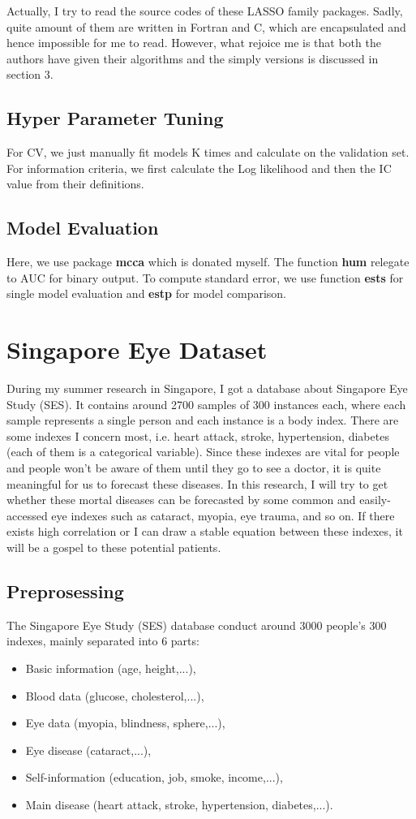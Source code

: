 \documentclass[]{article}
\begin{document}
Actually, I try to read the source codes of these LASSO family packages. Sadly, quite amount of them are written in Fortran and C, which are encapsulated and hence impossible for me to read. However, what rejoice me is that both the authors have given their algorithms and the simply versions is discussed in section 3.
\subsection{Hyper Parameter Tuning}
For CV, we just manually fit models K times and calculate on the validation set. For information criteria, we first calculate the Log likelihood and then the IC value from their definitions.
\subsection{Model Evaluation}
Here, we use package \textbf{mcca} which is donated myself. The function \textbf{hum} relegate to AUC for binary output. To compute standard error, we use function \textbf{ests} for single model evaluation and \textbf{estp} for model comparison.


\section{Singapore Eye Dataset}
During my summer research in Singapore, I got a database about Singapore  Eye Study (SES). It contains around 2700 samples of 300 instances each, where each sample represents a single person and each instance is a body index. There are some indexes I concern most, i.e. heart attack, stroke, hypertension, diabetes (each of them is a categorical variable). Since these indexes are vital for people and people won’t be aware of them until they go to see a doctor, it is quite meaningful for us to forecast these diseases. In this research, I will try to get whether these mortal diseases can be forecasted by some common and easily-accessed eye indexes such as cataract, myopia, eye trauma, and so on. If there exists high correlation or I can draw a stable equation between these indexes, it will be a gospel to these potential patients.
\subsection{Preprosessing}
The Singapore  Eye Study (SES) database conduct around 3000 people’s 300 indexes, mainly separated into 6 parts: 
\begin{itemize}
	\item Basic information (age, height,...),
	\item Blood data (glucose, cholesterol,...),
	\item Eye data (myopia, blindness, sphere,...),
	\item Eye disease (cataract,...),
	\item Self-information (education, job, smoke, income,...),
	\item Main disease (heart attack, stroke, hypertension, diabetes,...).
\end{itemize}
      
\end{document}
